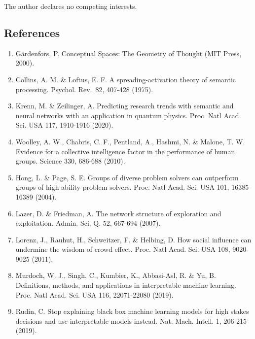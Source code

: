 The author declares no competing interests.

\hypertarget{references}{%
\subsection{References}\label{references}}

\begin{enumerate}
\def\labelenumi{\arabic{enumi}.}
\tightlist
\item
  Gärdenfors, P. Conceptual Spaces: The Geometry of Thought (MIT Press,
  2000).\\
\item
  Collins, A. M. \& Loftus, E. F. A spreading-activation theory of
  semantic processing. Psychol. Rev.~82, 407-428 (1975).\\
\item
  Krenn, M. \& Zeilinger, A. Predicting research trends with semantic
  and neural networks with an application in quantum physics. Proc. Natl
  Acad. Sci. USA 117, 1910-1916 (2020).\\
\item
  Woolley, A. W., Chabris, C. F., Pentland, A., Hashmi, N. \& Malone, T.
  W. Evidence for a collective intelligence factor in the performance of
  human groups. Science 330, 686-688 (2010).\\
\item
  Hong, L. \& Page, S. E. Groups of diverse problem solvers can
  outperform groups of high-ability problem solvers. Proc. Natl Acad.
  Sci. USA 101, 16385-16389 (2004).\\
\item
  Lazer, D. \& Friedman, A. The network structure of exploration and
  exploitation. Admin. Sci. Q. 52, 667-694 (2007).\\
\item
  Lorenz, J., Rauhut, H., Schweitzer, F. \& Helbing, D. How social
  influence can undermine the wisdom of crowd effect. Proc. Natl Acad.
  Sci. USA 108, 9020-9025 (2011).\\
\item
  Murdoch, W. J., Singh, C., Kumbier, K., Abbasi-Asl, R. \& Yu, B.
  Definitions, methods, and applications in interpretable machine
  learning. Proc. Natl Acad. Sci. USA 116, 22071-22080 (2019).\\
\item
  Rudin, C. Stop explaining black box machine learning models for high
  stakes decisions and use interpretable models instead. Nat. Mach.
  Intell. 1, 206-215 (2019).\\

\end{enumerate}

